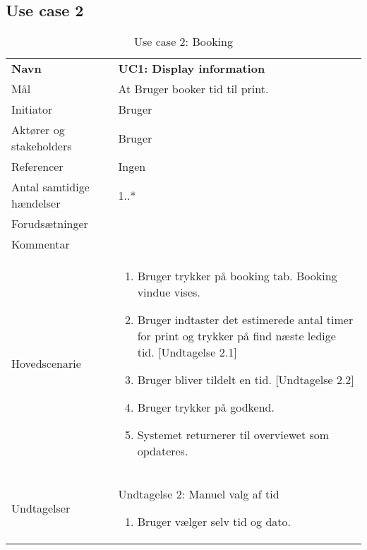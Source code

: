 \subsection{Use case 2}
\begin{table}[H]
	\centering
    \begin{tabular}{ l | p{9.6cm} }
    \toprule
    \textbf{Navn} & \textbf{UC1: Display information}						\\\otoprule
    Mål			& At Bruger booker tid til print.						\\\hline
    Initiator 	& Bruger 												\\\hline
    Aktører og stakeholders 	& Bruger										\\\hline
    Referencer 				& Ingen 										\\\hline
    Antal samtidige hændelser 	& 1..*									\\\hline
    Forudsætninger 				& \vspace{-2mm}							\\\hline
    Kommentar 					& 	 									\\\hline
    Hovedscenarie 				& 
    \begin{enumerate}
    	\item Bruger trykker på booking tab. Booking vindue vises.
    	\item Bruger indtaster det estimerede antal timer for print og trykker på find næste ledige tid.
    	[Undtagelse 2.1]
    	\item Bruger bliver tildelt en tid.
    	[Undtagelse 2.2]
    	\item Bruger trykker på godkend.
    	\item Systemet returnerer til overviewet som opdateres. 
	\end{enumerate} 														\\\hline
	
    Undtagelser 			&
 	Undtagelse 2: Manuel valg af tid
        \begin{enumerate}
        	\item Bruger vælger selv tid og dato.
        \end{enumerate}
\\\bottomrule
    \end{tabular}
    \caption{Use case 2: Booking}
    \label{tab:use case 1}
\end{table}









